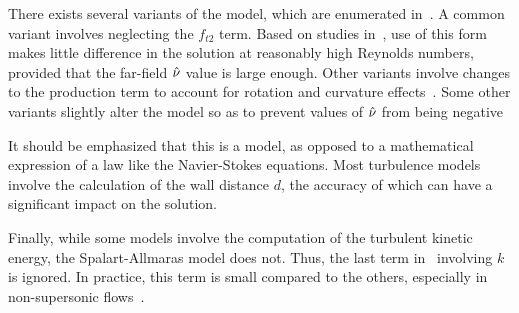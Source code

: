 There exists several variants of the model, which are enumerated in~\cite{tmrsa}. A common variant involves neglecting the $f_{t2}$ term. Based on studies in~\cite{rumsey2007apparent}, use of this form makes little difference in the solution at reasonably high Reynolds numbers, provided that the far-field $\sa$ value is large enough. Other variants involve changes to the production term to account for rotation and curvature effects~\cite{shur2000turbulence,dacles1995numerical,dacles1999numerical}. Some other variants slightly alter the model so as to prevent values of $\sa$ from being negative

It should be emphasized that this is a model, as opposed to a mathematical expression of a law like the Navier-Stokes equations. Most turbulence models involve the calculation of the wall distance $d$, the accuracy of which can have a significant impact on the solution.

Finally, while some models involve the computation of the turbulent kinetic energy, the Spalart-Allmaras model does not. Thus, the last term in~ involving $k$ is ignored. In practice, this term is small compared to the others, especially in non-supersonic flows~\cite{tmrsa}.

